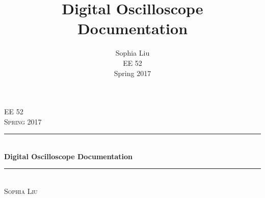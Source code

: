 \documentclass[12pt]{refart} %
\title{Digital Oscilloscope Documentation}
\author{Sophia Liu \\
	EE 52 \\
	Spring 2017}
\begin{document}
\begin{fullpage}
\begin{titlepage} %
	\newcommand{\HRule}{\rule{\linewidth}{0.5mm}} %
	
	\center %
	
	
	
	\textsc{\Large EE 52}\\[0.5cm] %
	
	\textsc{\large Spring 2017}\\[0.5cm] %
	
	
	\HRule\\[0.4cm]
	
	{\huge\bfseries Digital Oscilloscope Documentation}\\[0.4cm] %
	
	\HRule\\[1.0cm]
	

	{\large
	\textsc{Sophia Liu}} %
	
	
	\vfill\vfill\vfill %
	
	
	
	
	
	\vfill %
	
\end{titlepage} 
\end{fullpage}
\end{document}
